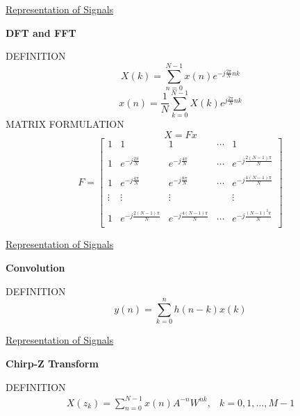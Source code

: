 \begin{slide}
{}
{\tiny\underline{Representation of Signals}}
\begin{center}
{\bf DFT and FFT}
\end{center}
\vfill
\vbox{
{\tiny
DEFINITION
%
$$
X(k)=\sum_{n=0}^{N-1}x(n)e^{-j\frac{2\pi}{N}nk}
$$
%
\vfil
%
$$
x(n)=\frac{1}{N}\sum_{k=0}^{N-1}X(k)e^{j\frac{2\pi}{N}nk}
$$
%
\vfil
MATRIX FORMULATION
%
$$
X=Fx
$$
$$
F=\left[\begin{array}{ccccc}
1&1&1&\cdots&1\\
\\
1&e^{-j\frac{2\pi}{N}}&e^{-j\frac{4\pi}{N}}&\cdots&e^{-j\frac{2(N-1)\pi}{N}}\\
\\
1&e^{-j\frac{4\pi}{N}}&e^{-j\frac{8\pi}{N}}&\cdots&e^{-j\frac{4(N-1)\pi}{N}}\\
\\
\vdots&\vdots&\vdots&&\vdots\\
\\
1&e^{-j\frac{2(N-1)\pi}{N}}&e^{-j\frac{4(N-1)\pi}{N}}&\cdots&e^{-j\frac{(N-1)^2\pi}{N}}\\
\end{array}\right]
$$
%
}}
\vfill
\end{slide}
\begin{slide}
{}
{\tiny\underline{Representation of Signals}}
\begin{center}
{\bf Convolution}
\end{center}
\vfill
\vbox{
{\tiny
DEFINITION
%
$$
y(n)=\sum_{k=0}^{n}h(n-k)x(k)
$$
%
}}
\vfill
\vbox{
}
\vfill
\end{slide}
\begin{slide}
{}
{\tiny\underline{Representation of Signals}}
\begin{center}
{\bf Chirp-Z Transform}
\end{center}
\vfill
\vbox{
{\tiny
DEFINITION
%
$$
\begin{array}{cc}
{\displaystyle X(z_k)=\sum_{n=0}^{N-1}x(n)A^{-n}W^{nk}}, & k=0,1,\ldots,M-1
\end{array}
$$
%
}}
\vfill
\vbox{
}
\vfill
\end{slide}
